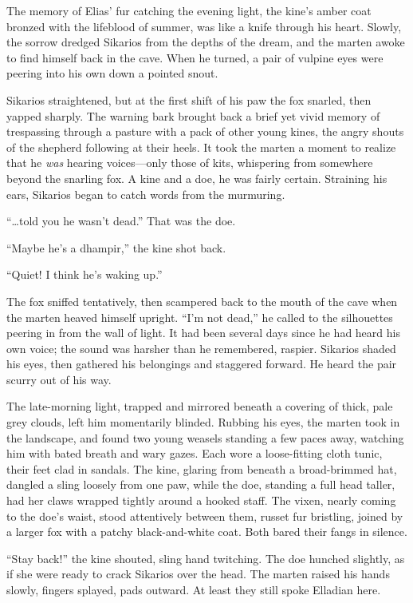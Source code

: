 The memory of Elias' fur catching the evening light, the kine's amber coat bronzed with the lifeblood of summer, was like a knife through his heart. Slowly, the sorrow dredged Sikarios from the depths of the dream, and the marten awoke to find himself back in the cave. When he turned, a pair of vulpine eyes were peering into his own down a pointed snout.

Sikarios straightened, but at the first shift of his paw the fox snarled, then yapped sharply. The warning bark brought back a brief yet vivid memory of trespassing through a pasture with a pack of other young kines, the angry shouts of the shepherd following at their heels. It took the marten a moment to realize that he \emph{was} hearing voices---only those of kits, whispering from somewhere beyond the snarling fox. A kine and a doe, he was fairly certain. Straining his ears, Sikarios began to catch words from the murmuring.

``\ldots told you he wasn't dead.'' That was the doe.

``Maybe he's a dhampir,'' the kine shot back.

``Quiet! I think he's waking up.''

The fox sniffed tentatively, then scampered back to the mouth of the cave when the marten heaved himself upright. ``I'm not dead,'' he called to the silhouettes peering in from the wall of light. It had been several days since he had heard his own voice; the sound was harsher than he remembered, raspier. Sikarios shaded his eyes, then gathered his belongings and staggered forward. He heard the pair scurry out of his way.

The late-morning light, trapped and mirrored beneath a covering of thick, pale grey clouds, left him momentarily blinded. Rubbing his eyes, the marten took in the landscape, and found two young weasels standing a few paces away, watching him with bated breath and wary gazes. Each wore a loose-fitting cloth tunic, their feet clad in sandals. The kine, glaring from beneath a broad-brimmed hat, dangled a sling loosely from one paw, while the doe, standing a full head taller, had her claws wrapped tightly around a hooked staff. The vixen, nearly coming to the doe's waist, stood attentively between them, russet fur bristling, joined by a larger fox with a patchy black-and-white coat. Both bared their fangs in silence.

``Stay back!'' the kine shouted, sling hand twitching. The doe hunched slightly, as if she were ready to crack Sikarios over the head. The marten raised his hands slowly, fingers splayed, pads outward. At least they still spoke Elladian here.

